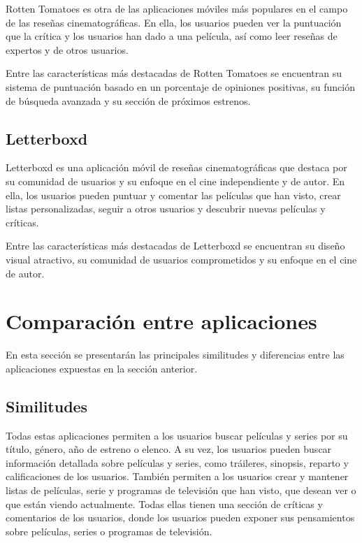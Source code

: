 Rotten Tomatoes es otra de las aplicaciones móviles más populares en el campo de las reseñas cinematográficas. En ella, los usuarios pueden ver la puntuación que la crítica y los usuarios han dado a una película, así como leer reseñas de expertos y de otros usuarios.

Entre las características más destacadas de Rotten Tomatoes se encuentran su sistema de puntuación basado en un porcentaje de opiniones positivas, su función de búsqueda avanzada y su sección de próximos estrenos.

\subsection{Letterboxd}

Letterboxd es una aplicación móvil de reseñas cinematográficas que destaca por su comunidad de usuarios y su enfoque en el cine independiente y de autor. En ella, los usuarios pueden puntuar y comentar las películas que han visto, crear listas personalizadas, seguir a otros usuarios y descubrir nuevas películas y críticas.

Entre las características más destacadas de Letterboxd se encuentran su diseño visual atractivo, su comunidad de usuarios comprometidos y su enfoque en el cine de autor.


\section{Comparación entre aplicaciones}

En esta sección se presentarán las principales similitudes y diferencias entre las aplicaciones expuestas en la sección anterior.

\subsection{Similitudes}

Todas estas aplicaciones permiten a los usuarios buscar películas y series por su título, género, año de estreno o elenco. A su vez, los usuarios pueden buscar información detallada sobre películas y series, como tráileres, sinopsis, reparto y calificaciones de los usuarios. También permiten a los usuarios crear y mantener listas de películas, serie y programas de televisión que han visto, que desean ver o que están viendo actualmente. Todas ellas tienen una sección de críticas y comentarios de los usuarios, donde los usuarios pueden exponer sus pensamientos sobre películas, series o programas de televisión.

